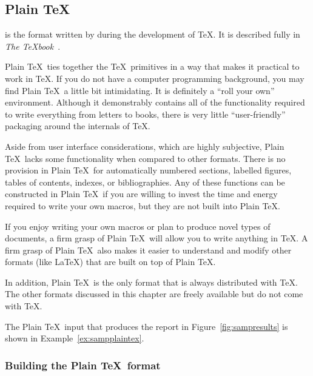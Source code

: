 \subsection{Plain \protect\TeX}

 is the format  
written by  during the development
of \TeX.  It is described fully in {\it The {\TeX}book}~\cite{kn:texbook}.

Plain \TeX\ ties together 
the \TeX\ primitives  in a way that makes
it practical to work in \TeX.  If you do not have a computer programming
background, you may find Plain \TeX\ a little bit intimidating.  It
is definitely a ``roll your own'' environment.  Although it demonstrably
contains all of the functionality required to write everything from
letters to books, there is very little ``user-friendly'' packaging
around the internals of \TeX.

Aside from user interface considerations, which are highly subjective,
Plain \TeX\ lacks some functionality when compared to other formats.
There is no provision in Plain \TeX\ for automatically numbered
sections, labelled figures, tables of contents, indexes, or bibliographies.
Any of these functions can be constructed in Plain \TeX\ if you are
willing to invest the time and energy required to write your own
macros, but they are not built into Plain \TeX.

If you enjoy writing your own macros or plan to produce
novel types of documents, a firm grasp of Plain \TeX\ will allow you
to write anything in \TeX.  A firm grasp of Plain \TeX\ also makes it easier
to understand and modify other formats (like \LaTeX) that are built
on top of Plain \TeX.

In addition, Plain \TeX\ is the only format that is always distributed with
\TeX.  The other formats discussed in this chapter are freely
available but do not come with \TeX.

The Plain \TeX\ input that produces the report in
Figure~\ref{fig:sampresults} is shown in Example~\ref{ex:sampplaintex}.



\subsubsection{Building the Plain \protect\TeX\ format}

